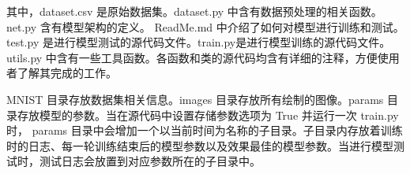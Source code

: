 \documentclass[supercite]{Experimental_Report}
\theoremstyle{definition}
\begin{document}
其中，dataset.csv 是原始数据集。dataset.py 中含有数据预处理的相关函数。net.py 含有模型架构的定义。
ReadMe.md 中介绍了如何对模型进行训练和测试。test.py 是进行模型测试的源代码文件。train.py是进行模型训练的源代码文件。
utils.py 中含有一些工具函数。各函数和类的源代码均含有详细的注释，方便使用者了解其完成的工作。

MNIST 目录存放数据集相关信息。images 目录存放所有绘制的图像。params 目录存放模型的参数。当在源代码中设置存储参数选项为 True 并运行一次 train.py 时，
params 目录中会增加一个以当前时间为名称的子目录。子目录内存放着训练时的日志、每一轮训练结束后的模型参数以及效果最佳的模型参数。当进行模型测试时，测试日志会放置到对应参数所在的子目录中。
\end{document}
